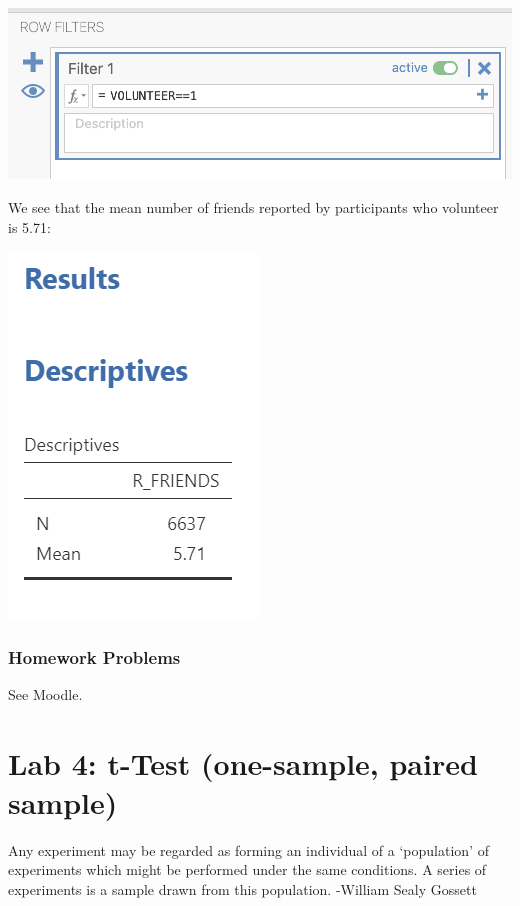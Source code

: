 \documentclass[
]{book}
\begin{document}
\includegraphics{img/FilterVolunteer.png}

We see that the mean number of friends reported by participants who volunteer is 5.71:

\includegraphics{img/MeanFriendsVolunteers.png}

\hypertarget{homework-problems}{%
\subsection{Homework Problems}\label{homework-problems}}

See Moodle.

\hypertarget{lab-4-t-test-one-sample-paired-sample}{%
\chapter{Lab 4: t-Test (one-sample, paired sample)}\label{lab-4-t-test-one-sample-paired-sample}}

{
Any experiment may be regarded as forming an individual of a `population' of experiments which might be performed under the same conditions. A series of experiments is a sample drawn from this population.
-William Sealy Gossett
}
\end{document}
